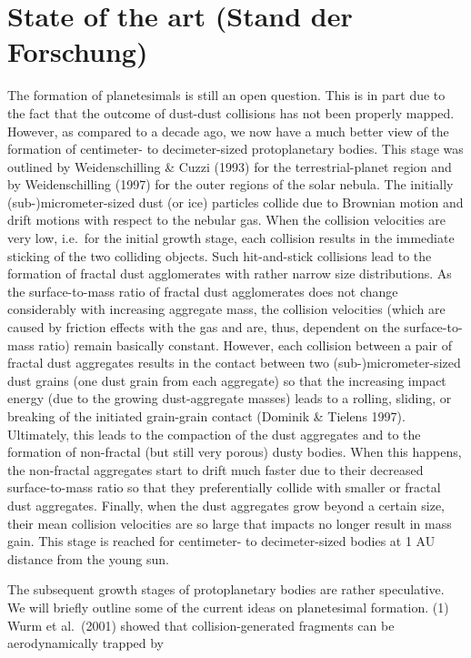 \section{State of the art (Stand der Forschung)}
The formation of planetesimals is still an open question. This is
in part due to the fact that the outcome of dust-dust collisions
has not been properly mapped. However, as compared to a decade
ago, we now have a much better view of the formation of
centimeter- to decimeter-sized protoplanetary bodies. This stage
was outlined by Weidenschilling \& Cuzzi (1993) for the
terrestrial-planet region and by Weidenschilling (1997) for the
outer regions of the solar nebula. The initially
(sub-)micrometer-sized dust (or ice) particles collide due to
Brownian motion and drift motions with respect to the nebular gas.
When the collision velocities are very low, i.e.\ for the initial
growth stage, each collision results in the immediate sticking of
the two colliding objects. Such hit-and-stick collisions lead to
the formation of fractal dust agglomerates with rather narrow size
distributions. As the surface-to-mass ratio of fractal dust
agglomerates does not change considerably with increasing
aggregate mass, the collision velocities (which are caused by
friction effects with the gas and are, thus, dependent on the
surface-to-mass ratio) remain basically constant. However, each
collision between a pair of fractal dust aggregates results in the
contact between two (sub-)micrometer-sized dust grains (one dust
grain from each aggregate) so that the increasing impact energy
(due to the growing dust-aggregate masses) leads to a rolling,
sliding, or breaking of the initiated grain-grain contact (Dominik
\& Tielens 1997). Ultimately, this leads to the compaction of the
dust aggregates and to the formation of non-fractal (but still
very porous) dusty bodies. When this happens, the non-fractal
aggregates start to drift much faster due to their decreased
surface-to-mass ratio so that they preferentially collide with
smaller or fractal dust aggregates. Finally, when the dust
aggregates grow beyond a certain size, their mean collision
velocities are so large that impacts no longer result in mass
gain. This stage is reached for centimeter- to decimeter-sized
bodies at 1 AU distance from the young sun.
\par
The subsequent growth stages of protoplanetary bodies are rather
speculative. We will briefly outline some of the current ideas on
planetesimal formation. (1) Wurm et al.\ (2001) showed that
collision-generated fragments can be aerodynamically trapped by
